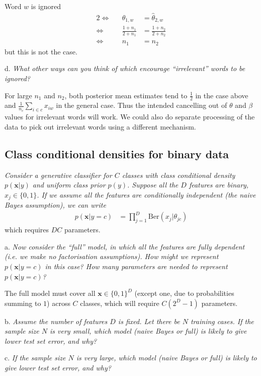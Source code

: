 Word $w$ is ignored
\begin{alignat*}{2}
\iff&& \hat\theta_{1,w} &= \hat\theta_{2,w}\\
\iff&& \frac{1+n_1}{2+n_1} &= \frac{1+n_2}{2+n_2}\\
\iff&& n_1 &= n_2
\end{alignat*}
but this is not the case.

d. \textit{What other ways can you think of which encourage ``irrelevant'' words to be ignored?}

For large $n_1$ and $n_2$, both posterior mean estimates tend to $\frac{1}{2}$ in the case above and $\frac{1}{n_c}\sum_{i\in c}x_{iw}$ in the general case. Thus the intended cancelling out of $\theta$ and $\beta$ values for irrelevant words will work. We could also do separate processing of the data to pick out irrelevant words using a different mechanism.

\subsection{Class conditional densities for binary data}
\textit{Consider a generative classifier for $C$ classes with class conditional density $p(\bm{x}|y)$ and uniform class prior $p(y)$. Suppose all the $D$ features are binary, $x_j\in\{0,1\}$. If we assume all the features are conditionally independent (the naive Bayes assumption), we can write}
\begin{align*}
p(\bm{x}|y=c) &= \prod_{j=1}^D \text{Ber}(x_j|\theta_{jc})
\end{align*}
which requires $DC$ parameters.

a. \textit{Now consider the ``full'' model, in which all the features are fully dependent (i.e. we make no factorisation assumptions). How might we represent $p(\bm{x}|y=c)$ in this case? How many parameters are needed to represent $p(\bm{x}|y=c)$?}

The full model must cover all $\mathbf{x} \in \{0,1\}^D$ (except one, due to probabilities summing to $1$) across $C$ classes, which will require $C(2^D-1)$ parameters.

b. \textit{Assume the number of features $D$ is fixed. Let there be $N$ training cases. If the sample size $N$ is very small, which model (naive Bayes or full) is likely to give lower test set error, and why?}

c. \textit{If the sample size $N$ is very large, which model (naive Bayes or full) is likely to give lower test set error, and why?}

